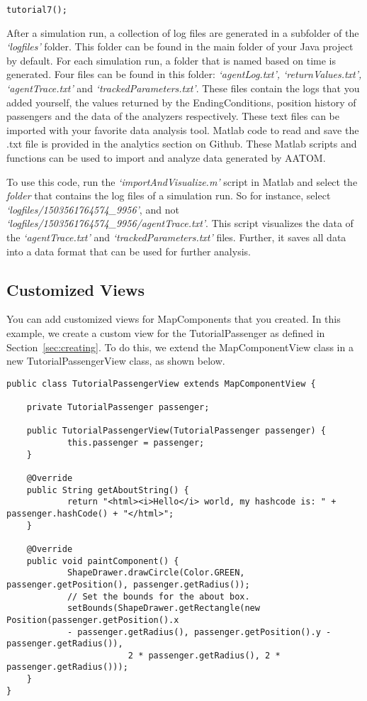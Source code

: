 \documentclass{article}
\begin{document}
\begin{verbatim}
tutorial7();
\end{verbatim}

After a simulation run, a collection of log files are generated in a subfolder of the \textit{`logfiles'} folder. This folder can be found in the main folder of your Java project by default. For each simulation run, a folder that is named based on time is generated. Four files can be found in this folder: \textit{`agentLog.txt', `returnValues.txt', `agentTrace.txt'} and \textit{`trackedParameters.txt'}. These files contain the logs that you added yourself, the values returned by the EndingConditions, position history of passengers and the data of the analyzers respectively. These text files can be imported with your favorite data analysis tool. 
Matlab code to read and save the .txt file is provided in the analytics section on Github. These Matlab scripts and functions can be used to import and analyze data generated by AATOM. 

To use this code, run the \textit{`importAndVisualize.m'} script in Matlab and select the \textit{folder} that contains the log files of a simulation run. So for instance, select \textit{`logfiles/1503561764574\_9956'}, and not \textit{`logfiles/1503561764574\_9956/agentTrace.txt'}. This script visualizes the data of the \textit{`agentTrace.txt'} and \textit{`trackedParameters.txt'} files. Further, it saves all data into a data format that can be used for further analysis.

\subsection{Customized Views}
You can add customized views for MapComponents that you created. In this example, we create a custom view for the TutorialPassenger as defined in Section~\ref{sec:creating}. To do this, we extend the MapComponentView class in a new TutorialPassengerView class, as shown below.

\begin{verbatim}
public class TutorialPassengerView extends MapComponentView {

	private TutorialPassenger passenger;

	public TutorialPassengerView(TutorialPassenger passenger) {
		    this.passenger = passenger;
	}

	@Override
	public String getAboutString() {
		    return "<html><i>Hello</i> world, my hashcode is: " + passenger.hashCode() + "</html>";
	}

	@Override
	public void paintComponent() {
		    ShapeDrawer.drawCircle(Color.GREEN, passenger.getPosition(), passenger.getRadius());
		    // Set the bounds for the about box.
		    setBounds(ShapeDrawer.getRectangle(new Position(passenger.getPosition().x
		    - passenger.getRadius(), passenger.getPosition().y - passenger.getRadius()),
					    2 * passenger.getRadius(), 2 * passenger.getRadius()));
	}
}
\end{verbatim}
\end{document}
